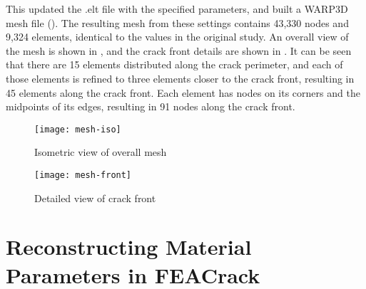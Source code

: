 This updated the .elt file with the specified parameters, and built a WARP3D mesh file ().
The resulting mesh from these settings contains 43,330 nodes and 9,324 elements, identical to the values in the original study.
An overall view of the mesh is shown in , and the crack front details are shown in .
It can be seen that there are 15 elements distributed along the crack perimeter, and each of those elements is refined to three elements closer to the crack front, resulting in 45 elements along the crack front.
Each element has nodes on its corners and the midpoints of its edges, resulting in 91 nodes along the crack front.
\begin{figure}[tbp]
\centering
\texttt{[image: mesh-iso]}
\caption{\label{fig:mesh-iso} Isometric view of overall mesh}
\end{figure}
\begin{figure}[tbp]
\centering
\texttt{[image: mesh-front]}
\caption{\label{fig:mesh-front} Detailed view of crack front}
\end{figure}

\section{Reconstructing Material Parameters in FEACrack}

